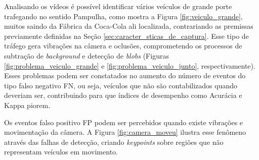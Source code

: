 Analisando os vídeos é possível identificar vários veículos de grande porte trafegando no sentido Pampulha, como mostra a Figura \ref{fig:veiculo_grande}, muitos saindo da Fábrica da Coca-Cola ali localizada, contrariando as premissas previamente definidas na Seção \ref{sec:caracter_sticas_de_captura}. Esse tipo de tráfego gera vibrações na câmera e oclusões, comprometendo os processos de subtração de \textit{background} e detecção de \textit{blobs} (Figuras \ref{fig:problema_veiculo_grande} e \ref{fig:problema_veiculo_junto}, respectivamente). Esses problemas podem ser constatados no aumento do número de eventos do tipo falso negativo FN, ou seja, veículos que não são contabilizados quando deveriam ser, contribuindo para que índices de desempenho como Acurácia e Kappa piorem.

Os eventos falso positivo FP podem ser percebidos quando existe vibrações e movimentação da câmera. A Figura \ref{fig:camera_moveu} ilustra esse fenômeno através das falhas de detecção, criando \textit{keypoints} sobre regiões que não representam veículos em movimento.

